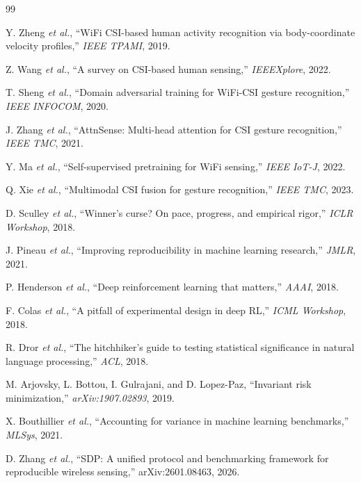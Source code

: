 \documentclass[11pt]{article}
\theoremstyle{definition}
\newcommand{\etal}{\textit{et al.}}
\begin{document}

\begin{thebibliography}{99}

 Y. Zheng \etal, ``WiFi CSI-based human activity recognition via body-coordinate velocity profiles,'' \emph{IEEE TPAMI}, 2019.

 Z. Wang \etal, ``A survey on CSI-based human sensing,'' \emph{IEEEXplore}, 2022.

 T. Sheng \etal, ``Domain adversarial training for WiFi-CSI gesture recognition,'' \emph{IEEE INFOCOM}, 2020.

 J. Zhang \etal, ``AttnSense: Multi-head attention for CSI gesture recognition,'' \emph{IEEE TMC}, 2021.

 Y. Ma \etal, ``Self-supervised pretraining for WiFi sensing,'' \emph{IEEE IoT-J}, 2022.

 Q. Xie \etal, ``Multimodal CSI fusion for gesture recognition,'' \emph{IEEE TMC}, 2023.

 D. Sculley \etal, ``Winner's curse? On pace, progress, and empirical rigor,'' \emph{ICLR Workshop}, 2018.

 J. Pineau \etal, ``Improving reproducibility in machine learning research,'' \emph{JMLR}, 2021.

 P. Henderson \etal, ``Deep reinforcement learning that matters,'' \emph{AAAI}, 2018.

 F. Colas \etal, ``A pitfall of experimental design in deep RL,'' \emph{ICML Workshop}, 2018.

 R. Dror \etal, ``The hitchhiker's guide to testing statistical significance in natural language processing,'' \emph{ACL}, 2018.

 M. Arjovsky, L. Bottou, I. Gulrajani, and D. Lopez-Paz, ``Invariant risk minimization,'' \emph{arXiv:1907.02893}, 2019.

 X. Bouthillier \etal, ``Accounting for variance in machine learning benchmarks,'' \emph{MLSys}, 2021.

 D. Zhang \etal, ``SDP: A unified protocol and benchmarking framework for reproducible wireless sensing,'' arXiv:2601.08463, 2026.


\end{thebibliography}
\end{document}
